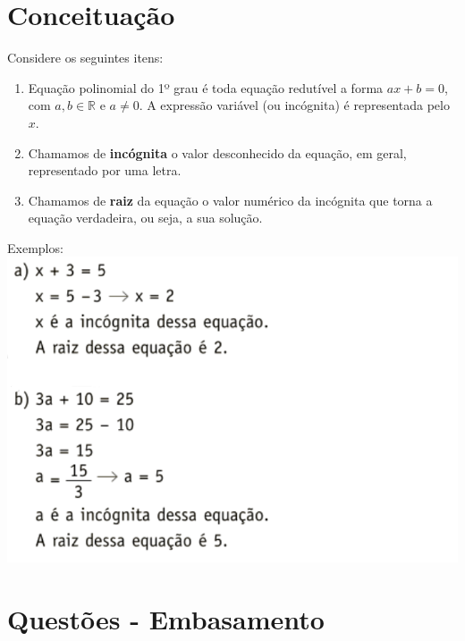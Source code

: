 \documentclass[a4paper,12pt]{article}
\begin{document}
	\section*{Conceituação}

		Considere os seguintes itens:

		\begin{enumerate}
			\item Equação polinomial do 1º grau é toda equação redutível a forma $ax+b=0$, com $a, b \in \mathbb{R}$ e $a \neq 0$. A expressão variável (ou incógnita) é representada pelo $x$. 
			
			\item Chamamos de \textbf{incógnita} o valor desconhecido da equação, em geral, representado
			por uma letra. \\

			\item Chamamos de \textbf{raiz} da equação o valor numérico da incógnita que torna a equação verdadeira,
			ou seja, a sua solução. \\
		\end{enumerate} 

		Exemplos: \\

		\includegraphics[scale=0.5]{def.png}

		\section*{Questões - Embasamento}
        
\end{document}
